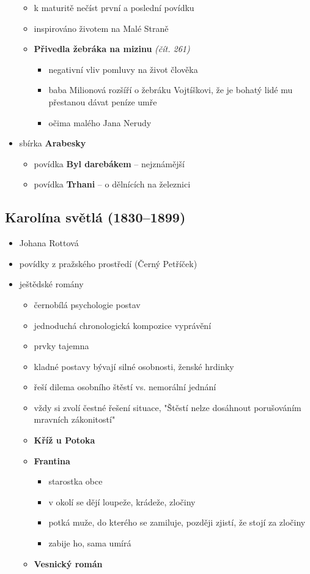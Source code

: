 \begin{itemize}
	\begin{itemize}
	\item k maturitě nečíst první a poslední povídku
	\item inspirováno životem na Malé Straně
	\item \textbf{Přivedla žebráka na mizinu} \textit{(čít. 261)}
		\begin{itemize}
		\item negativní vliv pomluvy na život člověka
		\item baba Milionová rozšíří o žebráku Vojtíškovi, že je bohatý \ra lidé mu přestanou dávat peníze \ra  umře
		\item očima malého Jana Nerudy
		\end{itemize}

	\end{itemize}
\item sbírka \textbf{Arabesky}
	\begin{itemize}
	\item povídka \textbf{Byl darebákem} -- nejznámější
	\item povídka \textbf{Trhani} -- o dělnících na železnici
	\end{itemize}
\end{itemize}

\subsection{Karolína světlá (1830--1899)}
\begin{itemize}
\item Johana Rottová
\item povídky z pražského prostředí (Černý Petříček)
\item ještědské romány 
	\begin{itemize}
	\item černobílá psychologie postav
	\item jednoduchá chronologická kompozice vyprávění
	\item prvky tajemna
	\item kladné postavy bývají silné osobnosti, ženské hrdinky
	\item řeší dilema osobního štěstí vs. nemorální jednání
	\item vždy si zvolí čestné řešení situace, "Štěstí nelze dosáhnout porušováním mravních zákonitostí"
	\item \textbf{Kříž u Potoka}
	\item \textbf{Frantina}
		\begin{itemize}
		\item starostka obce
		\item v okolí se dějí loupeže, krádeže, zločiny
		\item potká muže, do kterého se zamiluje, později zjistí, že stojí za zločiny
		\item zabije ho, sama umírá
		\end{itemize}
	\item \textbf{Vesnický román}
	\end{itemize}
\end{itemize}

